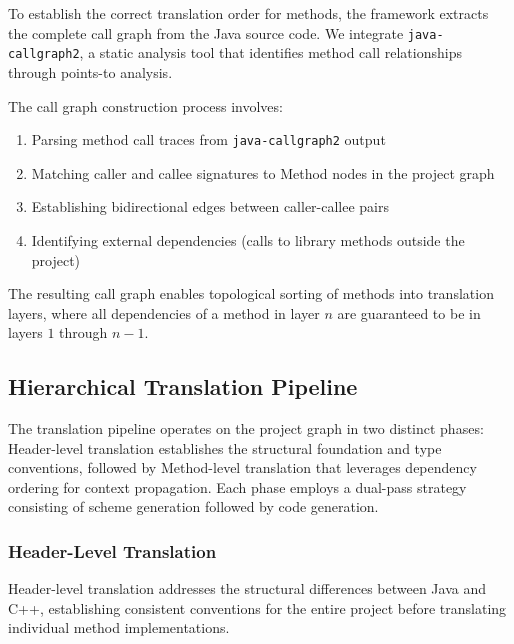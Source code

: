 To establish the correct translation order for methods, the framework extracts the complete call graph from the Java source code. We integrate \texttt{java-callgraph2}, a static analysis tool that identifies method call relationships through points-to analysis.

The call graph construction process involves:
\begin{enumerate}
\item Parsing method call traces from \texttt{java-callgraph2} output
\item Matching caller and callee signatures to Method nodes in the project graph
\item Establishing bidirectional edges between caller-callee pairs
\item Identifying external dependencies (calls to library methods outside the project)
\end{enumerate}

The resulting call graph enables topological sorting of methods into translation layers, where all dependencies of a method in layer $n$ are guaranteed to be in layers $1$ through $n-1$.

\subsection{Hierarchical Translation Pipeline}

The translation pipeline operates on the project graph in two distinct phases: Header-level translation establishes the structural foundation and type conventions, followed by Method-level translation that leverages dependency ordering for context propagation. Each phase employs a dual-pass strategy consisting of scheme generation followed by code generation.

\subsubsection{Header-Level Translation}

Header-level translation addresses the structural differences between Java and C++, establishing consistent conventions for the entire project before translating individual method implementations.

